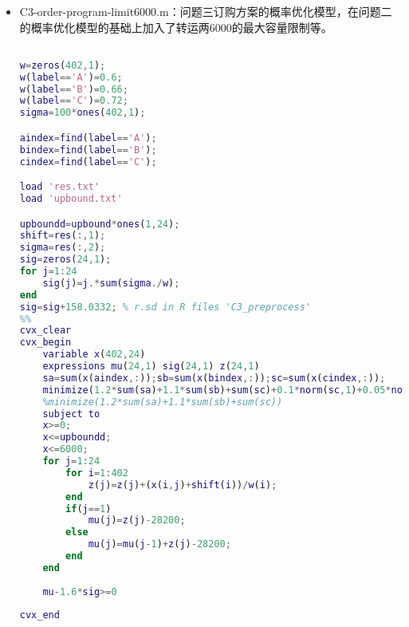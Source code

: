 \documentclass{my_paper}
\begin{document}
\begin{itemize}
\begin{lstlisting}
model:
sets:
supplyers/1..4/:;
weeks/1..24/:;
transporters/1..8/:;
rate(transporters,weeks): a;
assignment(supplyers,weeks): S;
decision(supplyers,weeks,transporters): T,ans; 
endsets

data:
a = @ole('C:\Users\HONOR\Desktop\C\data\p2_trans_pred.xlsx','pred_data');
S = @ole('C:\Users\HONOR\Desktop\C\data\p2_supply_prob.xlsx','pred_data');
@ole('C:\Users\HONOR\Desktop\C\res\p2_method_prob.xlsx','pred_data') = ans;
enddata
min = @sum(transporters(k):@sum(supplyers(i): @sum(weeks(j): S(i,j)*T(i,j,k)*a(k,j)))); 
@for(supplyers(i): @for(weeks(j): @sum(transporters(k): T(i,j,k))=1));
@for(transporters(k): @for(weeks(j): @sum(supplyers(i): (T(i,j,k))*S(i,j))<=6000)); 
@for(transporters(k):@for(supplyers(i): @for(weeks(j): @bin(T(i,j,k))))); 
@for(transporters(k): @for(weeks(j): @for(supplyers(i): ans(i,j,k) = T(i,j,k) * S(i,j)))); 
end

\end{lstlisting}

\item C3-order-program-limit6000.m：问题三订购方案的概率优化模型，在问题二的概率优化模型的基础上加入了转运两6000的最大容量限制等。

\begin{lstlisting}[language={Matlab}]

w=zeros(402,1);
w(label=='A')=0.6;
w(label=='B')=0.66;
w(label=='C')=0.72;
sigma=100*ones(402,1);

aindex=find(label=='A');
bindex=find(label=='B');
cindex=find(label=='C');

load 'res.txt'
load 'upbound.txt'

upboundd=upbound*ones(1,24);
shift=res(:,1);
sigma=res(:,2);
sig=zeros(24,1);
for j=1:24
    sig(j)=j.*sum(sigma./w);
end
sig=sig+158.0332; % r.sd in R files 'C3_preprocess'
%%
cvx_clear
cvx_begin
    variable x(402,24) 
    expressions mu(24,1) sig(24,1) z(24,1)
    sa=sum(x(aindex,:));sb=sum(x(bindex,:));sc=sum(x(cindex,:));
    minimize(1.2*sum(sa)+1.1*sum(sb)+sum(sc)+0.1*norm(sc,1)+0.05*norm(sb,1))
    %minimize(1.2*sum(sa)+1.1*sum(sb)+sum(sc))
    subject to
    x>=0;
    x<=upboundd;
    x<=6000;
    for j=1:24
        for i=1:402
            z(j)=z(j)+(x(i,j)+shift(i))/w(i);
        end
        if(j==1)
            mu(j)=z(j)-28200;
        else
            mu(j)=mu(j-1)+z(j)-28200;
        end
    end
    
    mu-1.6*sig>=0
    
cvx_end


\end{lstlisting}
\end{itemize}
\end{document}

